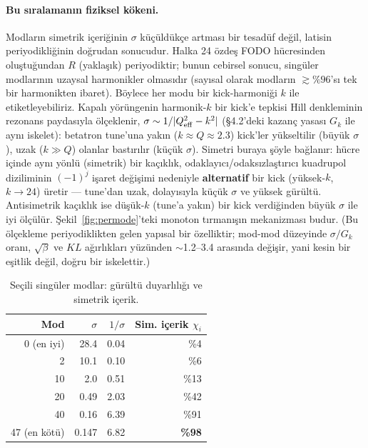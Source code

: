\documentclass[twocolumn,a4paper,10pt]{article}
\begin{document}
\paragraph{Bu sıralamanın fiziksel kökeni.} Modların simetrik içeriğinin
$\sigma$ küçüldükçe artması bir tesadüf değil, latisin periyodikliğinin doğrudan
sonucudur. Halka 24 özdeş FODO hücresinden oluştuğundan $R$ (yaklaşık)
periyodiktir; bunun cebirsel sonucu, singüler modlarının uzaysal harmonikler
olmasıdır (sayısal olarak modların $\gtrsim\!\%96$'sı tek bir harmonikten ibaret).
Böylece her modu bir kick-harmoniği $k$ ile etiketleyebiliriz. Kapalı yörüngenin
harmonik-$k$ bir kick'e tepkisi Hill denkleminin rezonans paydasıyla ölçeklenir,
$\sigma \sim 1/|Q_{\rm eff}^2-k^2|$ (\S4.2'deki kazanç yasası $G_k$ ile aynı
iskelet): betatron tune'una yakın ($k\approx Q\approx2.3$) kick'ler yükseltilir
(büyük $\sigma$), uzak ($k\gg Q$) olanlar bastırılır (küçük $\sigma$). Simetri
buraya şöyle bağlanır: hücre içinde aynı yönlü (simetrik) bir kaçıklık,
odaklayıcı/odaksızlaştırıcı kuadrupol diziliminin $(-1)^j$ işaret değişimi
nedeniyle \textbf{alternatif} bir kick (yüksek-$k$, $k\!\to\!24$) üretir ---
tune'dan uzak, dolayısıyla küçük $\sigma$ ve yüksek gürültü. Antisimetrik
kaçıklık ise düşük-$k$ (tune'a yakın) bir kick verdiğinden büyük $\sigma$ ile iyi
ölçülür. Şekil~\ref{fig:permode}'teki monoton tırmanışın mekanizması budur. (Bu
ölçekleme periyodiklikten gelen yapısal bir özelliktir; mod-mod düzeyinde
$\sigma/G_k$ oranı, $\sqrt\beta$ ve $KL$ ağırlıkları yüzünden $\sim$1.2--3.4
arasında değişir, yani kesin bir eşitlik değil, doğru bir iskelettir.)

\begin{table}[tb]
\centering\small
\caption{Seçili singüler modlar: gürültü duyarlılığı ve simetrik içerik.}
\label{tab:svd}
\begin{tabular}{@{}rrrr@{}}
\toprule
Mod & $\sigma$ & $1/\sigma$ & Sim. içerik $\chi_i$ \\
\midrule
0 (en iyi)  & 28.4  & 0.04 & \%4 \\
2           & 10.1  & 0.10 & \%6 \\
10          & 2.0   & 0.51 & \%13 \\
20          & 0.49  & 2.03 & \%42 \\
40          & 0.16  & 6.39 & \%91 \\
47 (en kötü)& 0.147 & 6.82 & \textbf{\%98} \\
\bottomrule
\end{tabular}
\end{table}
\end{document}
